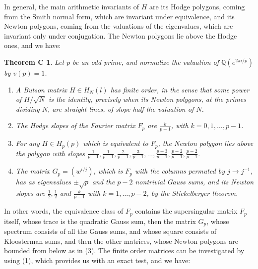 \documentclass[11pt]{amsart}
\newtheorem*{theoremC}{Theorem C}
\theoremstyle{definition}
\begin{document}
In general, the main arithmetic invariants of $H$ are its Hodge polygons, coming from the Smith normal form, which are invariant under equivalence, and its Newton polygons, coming from the valuations of the eigenvalues, which are invariant only under conjugation. The Newton polygons lie above the Hodge ones, and we have:

\begin{theoremC}
Let $p$ be an odd prime, and normalize the valuation of $\mathbb Q(e^{2\pi i/p})$ by $v(p)=1$.
\begin{enumerate}
\item A Butson matrix $H\in H_N(l)$ has finite order, in the sense that some power of $H/\sqrt{N}$ is the identity, precisely when its Newton polygons, at the primes dividing $N$, are straight lines, of slope half the valuation of $N$.

\item The Hodge slopes of the Fourier matrix $F_p$ are $\frac{k}{p-1}$, with $k=0,1,\ldots,p-1$.

\item For any $H\in H_p(p)$ which is equivalent to $F_p$, the Newton polygon lies above the polygon with slopes $\frac{1}{p-1},\frac{1}{p-1},\frac{2}{p-1},\frac{3}{p-1},\ldots,\frac{p-3}{p-1},\frac{p-2}{p-1},\frac{p-2}{p-1}$.

\item The matrix $G_p=(w^{i/j})$, which is $F_p$ with the columns permuted by $j\to j^{-1}$, has as eigenvalues $\pm\sqrt{p}$ and the $p-2$ nontrivial Gauss sums, and its Newton slopes are $\frac{1}{2},\frac{1}{2}$ and $\frac{k}{p-1}$ with $k=1,\ldots,p-2$, by the Stickelberger theorem.
\end{enumerate}
\end{theoremC}

In other words, the equivalence class of $F_p$ contains the supersingular matrix $F_p$ itself, whose trace is the quadratic Gauss sum, then the matrix $G_p$, whose spectrum consists of all the Gauss sums, and whose square consists of Kloosterman sums, and then the other matrices, whose Newton polygons are bounded from below as in (3). The finite order matrices can be investigated by using (1), which provides us with an exact test, and we have:
\end{document}
